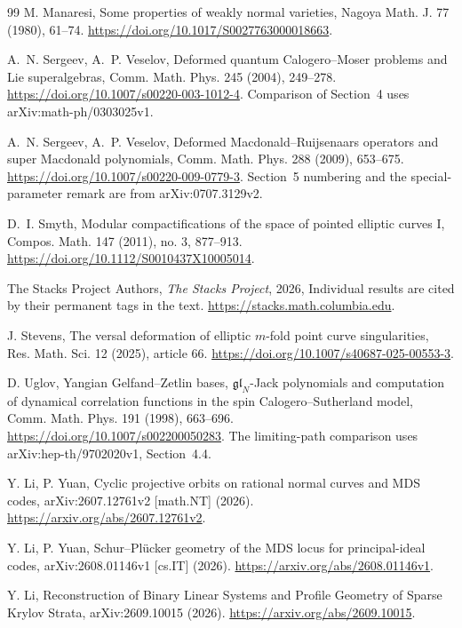 \documentclass[10pt,fleqn]{article}
\numberwithin{equation}{section}
\begin{document}
\begin{thebibliography}{99}
M. Manaresi,
Some properties of weakly normal varieties,
Nagoya Math. J. 77 (1980), 61--74.
\newblock \url{https://doi.org/10.1017/S0027763000018663}.

A.~N. Sergeev, A.~P. Veselov,
Deformed quantum Calogero--Moser problems and Lie superalgebras,
Comm. Math. Phys. 245 (2004), 249--278.
\newblock \url{https://doi.org/10.1007/s00220-003-1012-4}.
\newblock Comparison of Section~4 uses arXiv:math-ph/0303025v1.

A.~N. Sergeev, A.~P. Veselov,
Deformed Macdonald--Ruijsenaars operators and super Macdonald polynomials,
Comm. Math. Phys. 288 (2009), 653--675.
\newblock \url{https://doi.org/10.1007/s00220-009-0779-3}.
\newblock Section~5 numbering and the special-parameter remark are from
arXiv:0707.3129v2.

D.~I. Smyth,
Modular compactifications of the space of pointed elliptic curves I,
Compos. Math. 147 (2011), no. 3, 877--913.
\newblock \url{https://doi.org/10.1112/S0010437X10005014}.

The Stacks Project Authors,
\emph{The Stacks Project}, 2026,
Individual results are cited by their permanent tags in the text.
\newblock \url{https://stacks.math.columbia.edu}.

J. Stevens,
The versal deformation of elliptic $m$-fold point curve singularities,
Res. Math. Sci. 12 (2025), article 66.
\newblock \url{https://doi.org/10.1007/s40687-025-00553-3}.

D. Uglov,
Yangian Gelfand--Zetlin bases, $\mathfrak{gl}_N$-Jack polynomials and
computation of dynamical correlation functions in the spin
Calogero--Sutherland model,
Comm. Math. Phys. 191 (1998), 663--696.
\newblock \url{https://doi.org/10.1007/s002200050283}.
The limiting-path comparison uses arXiv:hep-th/9702020v1, Section~4.4.

Y. Li, P. Yuan,
Cyclic projective orbits on rational normal curves and MDS codes,
arXiv:2607.12761v2 [math.NT] (2026).
\newblock \url{https://arxiv.org/abs/2607.12761v2}.

Y. Li, P. Yuan,
Schur--Pl\"ucker geometry of the MDS locus for principal-ideal codes,
arXiv:2608.01146v1 [cs.IT] (2026).
\newblock \url{https://arxiv.org/abs/2608.01146v1}.

Y. Li,
Reconstruction of Binary Linear Systems and Profile Geometry of Sparse Krylov Strata,
arXiv:2609.10015 (2026).
\newblock \url{https://arxiv.org/abs/2609.10015}.

\end{thebibliography}
\end{document}
